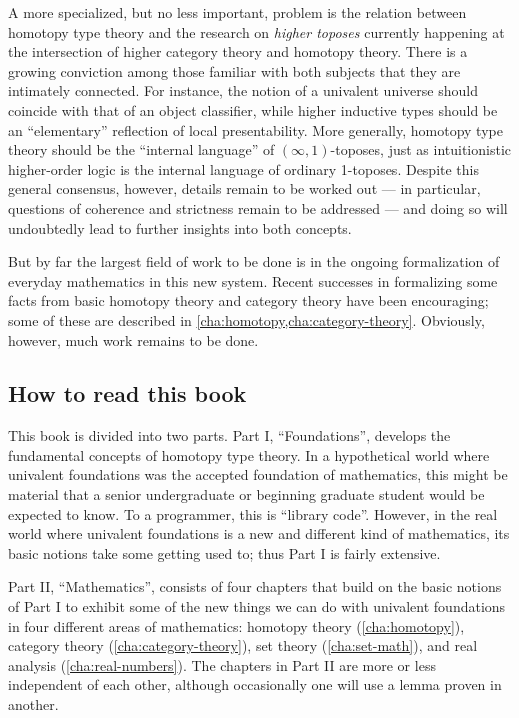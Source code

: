 A more specialized, but no less important, problem is the relation between homotopy type theory and the research  on \emph{higher toposes} currently happening at the intersection of higher category theory and homotopy theory.
There is a growing conviction among those familiar with both subjects that they are intimately connected.
For instance, the notion of a univalent universe should coincide with that of an object classifier, while higher inductive types should be an ``elementary'' reflection of local presentability.
More generally, homotopy type theory should be the ``internal language'' of $(\infty,1)$-toposes, just as intuitionistic higher-order logic is the internal language of ordinary 1-toposes.
Despite this general consensus, however, details remain to be worked out --- in particular, questions of coherence and strictness remain to be addressed  --- and doing so will undoubtedly lead to further insights into both concepts.

But by far the largest field of work to be done is in the ongoing formalization of everyday mathematics in this new system.
Recent successes in formalizing some facts from basic homotopy theory and category theory have been encouraging; some of these are described in \cref{cha:homotopy,cha:category-theory}.
Obviously, however, much work remains to be done.

%

\subsection*{How to read this book}

This book is divided into two parts.
Part I, ``Foundations'', develops the fundamental concepts of homotopy type theory.
In a hypothetical world where univalent foundations was the accepted foundation of mathematics, this might be material that a senior undergraduate or beginning graduate student would be expected to know.
To a programmer, this is ``library code''.
However, in the real world where univalent foundations is a new and different kind of mathematics, its basic notions take some getting used to; thus Part I is fairly extensive.

Part II, ``Mathematics'', consists of four chapters that build on the basic notions of Part I to exhibit some of the new things we can do with univalent foundations in four different areas of mathematics: homotopy theory (\autoref{cha:homotopy}), category theory (\autoref{cha:category-theory}), set theory (\autoref{cha:set-math}), and real analysis (\autoref{cha:real-numbers}).
The chapters in Part II are more or less independent of each other, although occasionally one will use a lemma proven in another.

